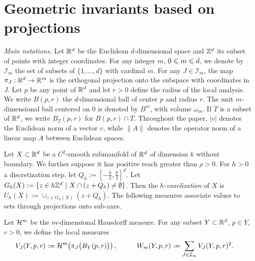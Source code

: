 \section{Geometric invariants based on projections}
\label{sec-invariants}

\noindent\emph{Main notations.}  Let $\mathbb{R}^d$ be the Euclidean
$d$-dimensional space and $\mathbb{Z}^d$ its subset of points with integer
coordinates. For any integer $m$, $0 \leqslant m \leqslant d$, we denote by
$\mathcal{I}_m$ the set of subsets of $\{1,\dots,d\}$ with cardinal
$m$. For any $J \in \mathcal{I}_m$, the map $\pi_J: \mathbb{R}^d \to \mathbb{R}^m$ is
the orthogonal projection onto the subspace with coordinates in
$J$. Let $p$ be any point of $\mathbb{R}^d$ and let $r>0$ define the radius of
the local analysis. We write $B(p,r)$ the $d$-dimensional ball of
center $p$ and radius $r$. The unit $m$-dimensional ball centered on
$0$ is denoted by $B^m$, with volume $\omega_m$. If $T$ is a subset of
$\mathbb{R}^d$, we write $B_T(p,r)$ for $B(p,r) \cap T$.  Throughout the
paper, $|v|$ denotes the Euclidean norm of a vector $v$, while $\|A\|$
denotes the operator norm of a linear map $A$ between Euclidean
spaces.

Let $X \subset \mathbb{R}^d$ be a $C^2$-smooth submanifold of $\mathbb{R}^d$ of
dimension $k$ without boundary. We further suppose it has positive
reach greater than $\rho>0$. For $h>0$ a discretization step, let
$Q_h:= \left[-\frac{h}{2}, \frac{h}{2}\right]^d$. Let $G_h(X) := \{ z
\in h\mathbb{Z}^d~|~X \cap (z+Q_h) \neq \emptyset \}$. Then the
\emph{$h$-voxelization} of $X$ is $U_h(X) := \cup_{z \in G_h(X)} (z +
Q_h)$.  The following measures associate values to sets through
projections onto sub-axes.

\begin{definition}
  \label{def-local-measures}
  Let $\mathcal{H}^m$ be the $m$-dimensional
  Hausdorff measure. For any subset $Y \subset \mathbb{R}^d$, $p \in Y$, $r>0$, we define the local measures
  \begin{align}
    V_J(Y,p,r) &:= \mathcal{H}^m\!\left( \pi_J\bigl(B_Y(p,r)\bigr) \right),
    \quad
    && & W_m(Y,p,r) & := \sum_{J \in \mathcal{I}_m} V_J(Y,p,r)^2.
  \end{align}
\end{definition}

